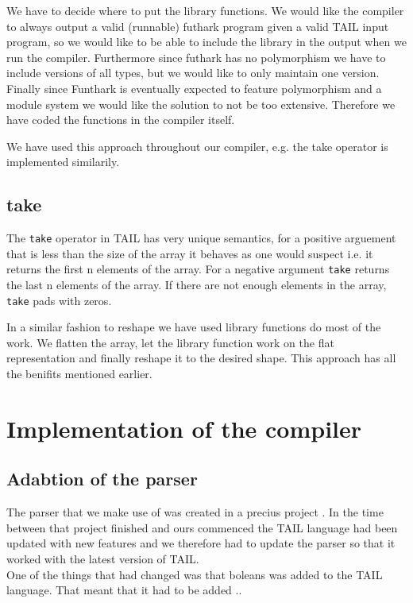 \documentclass[11pt]{article}
\begin{document}
We have to decide where to put the library functions.
We would like the compiler to always output a valid (runnable) futhark program given a valid TAIL input program, so we would like to
be able to include the library in the output when we run the compiler.
Furthermore since futhark has no polymorphism we have to include versions of all types, but we would like to only maintain one version.
Finally since Funthark is eventually expected to feature polymorphism and a module system we would like the solution to not be too
extensive. Therefore we have coded the functions in the compiler itself.

We have used this approach throughout our compiler, e.g. the take operator is implemented similarily.

\subsection{take} 

The {\tt take} operator in TAIL has very unique semantics, for a positive arguement that is less than the size of the array it behaves as one would suspect i.e. it returns the first n elements of the array. For a negative argument {\tt take} returns the last n elements of the array. If there are not enough elements in the array, {\tt take} pads with zeros.

In a similar fashion to reshape we have used library functions do most of the work.
We flatten the array, let the library function work on the flat representation and finally reshape it to the desired shape.
This approach has all the benifits mentioned earlier.

\section{Implementation of the compiler}

\subsection{Adabtion of the parser}
The parser that we make use of was created in a precius project \cite{APLACC}. In the time between that project finished and ours commenced the TAIL language had been updated with new features and we therefore had to update the parser so that it worked with the latest version of TAIL.\\

One of the things that had changed was that boleans was added to the TAIL language. That meant that it had to be added ..\\
\end{document}
